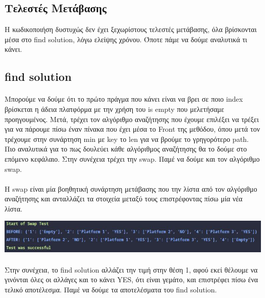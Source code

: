 \documentclass{article}
\begin{document}
    \subsection{Τελεστές Μετάβασης}
    Η κωδικοποιήση δυστυχώς δεν έχει ξεχωρίστους τελεστές μετάβασης, όλα βρίσκονται μέσα στο find solution, λόγω ελείψης χρόνου. Όποτε πάμε να δούμε αναλυτικά τι κάνει.

    \newpage
    \subsection{find solution}

    
    \paragraph{}
    Μπορούμε να δούμε ότι το πρώτο πράγμα που κάνει είναι να βρει σε ποιο index βρίσκεται η άδεια πλατφόρμα με την χρήση του is empty που μελετήσαμε προηγουμένος.
    Μετά, τρέχει τον αλγόριθμο αναζήτησης που έχουμε επιλέξει να τρέξει για να πάρουμε πίσω έναν πίνακα που έχει μέσα το Front της μεθόδου, όπου μετά τον τρέχουμε στην
    συνάρτηση min με key το len για να βρούμε το γρηγορότερο path. Πιο αναλυτικά για το πως δουλεύει κάθε αλγόριθμος αναζήτησης θα το δούμε στο επόμενο κεφάλαιο. Στην συνέχεια
    τρέχει την swap. Παμέ να δούμε και τον αλγόριθμο swap.
    
    \newpage
    
    \paragraph{}
    Η swap είναι μία βοηθητική συνάρτηση μετάβασης που την λίστα από τον αλγόριθμο αναζήτησης και ανταλλάζει τα στοιχεία μεταξύ τους επιστρέφοντας πίσω μία νέα λίστα.

    \includegraphics[scale=0.7]{images/swap.jpeg}
    \paragraph{}
    Στην συνέχεια, το find solution αλλάζει την τιμή στην θέση 1, αφού εκεί θέλουμε να γινόνται όλες οι αλλάγες και το κάνει YES, ότι είναι γεμάτο, και επιστρέφει πίσω
    ένα τελικό αποτέλεσμα. Παμέ να δούμε τα αποτελέσματα του find solution.
\end{document}
